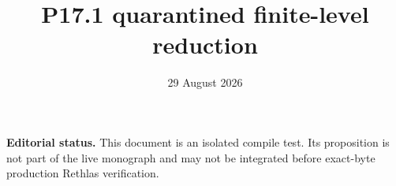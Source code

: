 \documentclass[11pt]{article}
\title{P17.1 quarantined finite-level reduction}
\author{}
\date{29 August 2026}
\theoremstyle{remark}
\begin{document}
\maketitle

\noindent
\textbf{Editorial status.}
This document is an isolated compile test. Its proposition is not part of
the live monograph and may not be integrated before exact-byte production
Rethlas verification.



\end{document}
